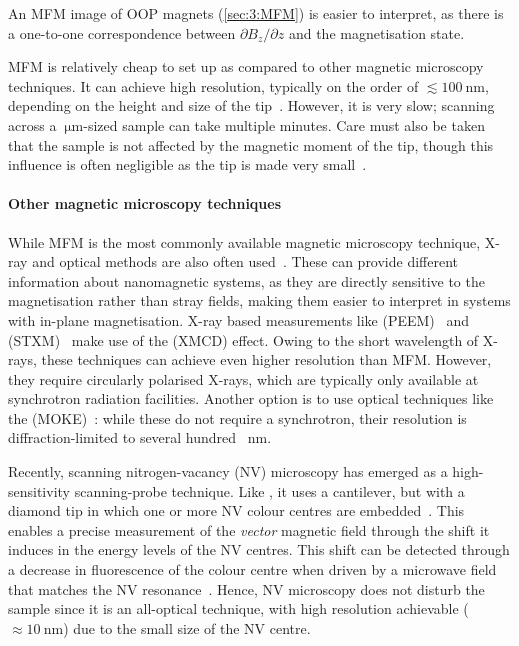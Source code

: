 An MFM image of OOP magnets (\cref{sec:3:MFM}) is easier to interpret, as there is a one-to-one correspondence between $\partial B_z/ \partial z$ and the magnetisation state. \par
MFM is relatively cheap to set up as compared to other magnetic microscopy techniques.
It can achieve high resolution, typically on the order of $\lesssim \SI{100}{\nano\metre}$, depending on the height and size of the tip~\cite{MFM}.
However, it is very slow; scanning across a $\SI{}{\micro\metre}$-sized sample can take multiple minutes.
Care must also be taken that the sample is not affected by the magnetic moment of the tip, though this influence is often negligible as the tip is made very small~\cite{Probing_MagnetoOptics}.

\paragraph{Other magnetic microscopy techniques}
While MFM is the most commonly available magnetic microscopy technique, X-ray and optical methods are also often used~\cite{DynamicEmergence_NanomagneticSystem}.
These can provide different information about nanomagnetic systems, as they are directly sensitive to the magnetisation rather than stray fields, making them easier to interpret in systems with in-plane magnetisation.
X-ray based measurements like  (PEEM)~\cite{PEEM} and  (STXM)~\cite{Imaging_MTXM} make use of the  (XMCD) effect.
Owing to the short wavelength of X-rays, these techniques can achieve even higher resolution than MFM.
However, they require circularly polarised X-rays, which are typically only available at synchrotron radiation facilities.
Another option is to use optical techniques like the  (MOKE)~\cite{KerrFaraday_book}: while these do not require a synchrotron, their resolution is diffraction-limited to several hundred \SI{}{\nano\metre}. \par
Recently, scanning nitrogen-vacancy (NV) microscopy has emerged as a high-sensitivity scanning-probe technique.
Like , it uses a cantilever, but with a diamond tip in which one or more NV colour centres are embedded~\cite{NVprospects}.
This enables a precise measurement of the \textit{vector} magnetic field through the shift it induces in the energy levels of the NV centres. %
This shift can be detected through a decrease in fluorescence of the colour centre when driven by a microwave field that matches the NV resonance~\cite{NVprinciples_QDM}.
Hence, NV microscopy does not disturb the sample since it is an all-optical technique, with high resolution achievable ($\approx \SI{10}{\nano\metre}$) due to the small size of the NV centre. %

